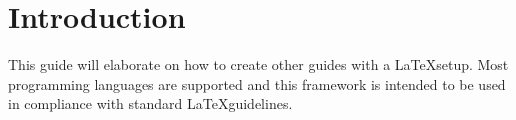 \section{Introduction}

This guide will elaborate on how to create other guides with a \LaTeX  setup. Most programming languages are supported and this framework is intended to be used in compliance with standard \LaTeX  guidelines. 
